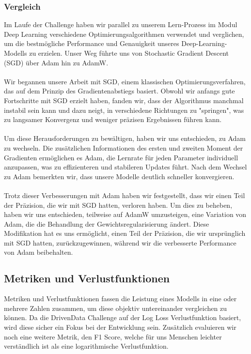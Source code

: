 \documentclass{article}
\begin{document}
\subsubsection{Vergleich}

Im Laufe der Challenge haben wir parallel zu unserem Lern-Prozess im Modul Deep Learning verschiedene Optimierungsalgorithmen verwendet und verglichen, um die bestmögliche Performance und Genauigkeit unseres Deep-Learning-Modells zu erzielen. Unser Weg führte uns von Stochastic Gradient Descent (SGD) über Adam hin zu AdamW.\\\\
Wir begannen unsere Arbeit mit SGD, einem klassischen Optimierungsverfahren, das auf dem Prinzip des Gradientenabstiegs basiert. Obwohl wir anfangs gute Fortschritte mit SGD erzielt haben, fanden wir, dass der Algorithmus manchmal instabil sein kann und dazu neigt, in verschiedene Richtungen zu "springen", was zu langsamer Konvergenz und weniger präzisen Ergebnissen führen kann.\\\\
Um diese Herausforderungen zu bewältigen, haben wir uns entschieden, zu Adam zu wechseln. Die zusätzlichen Informationen des ersten und zweiten Moment der Gradienten ermöglichen es Adam, die Lernrate für jeden Parameter individuell anzupassen, was zu effizienteren und stabileren Updates führt. Nach dem Wechsel zu Adam bemerkten wir, dass unsere Modelle deutlich schneller konvergieren.\\\\
Trotz dieser Verbesserungen mit Adam haben wir festgestellt, dass wir einen Teil der Präzision, die wir mit SGD hatten, verloren haben. Um dies zu beheben, haben wir uns entschieden, teilweise auf AdamW umzusteigen, eine Variation von Adam, die die Behandlung der Gewichtsregularisierung ändert. Diese Modifikation hat es uns ermöglicht, einen Teil der Präzision, die wir ursprünglich mit SGD hatten, zurückzugewinnen, während wir die verbesserte Performance von Adam beibehalten.

\newpage

\subsection{Metriken und Verlustfunktionen}
Metriken und Verlustfunktionen fassen die Leistung eines Modells in eine oder mehrere Zahlen zusammen, um diese objektiv untereinander vergleichen zu können. Da die DrivenData Challenge auf der Log Loss Verlustfunktion basiert, wird diese sicher ein Fokus bei der Entwicklung sein. Zusätzlich evaluieren wir noch eine weitere Metrik, den F1 Score, welche für uns Menschen leichter verständlich ist als eine logarithmische Verlustfunktion.
\end{document}
